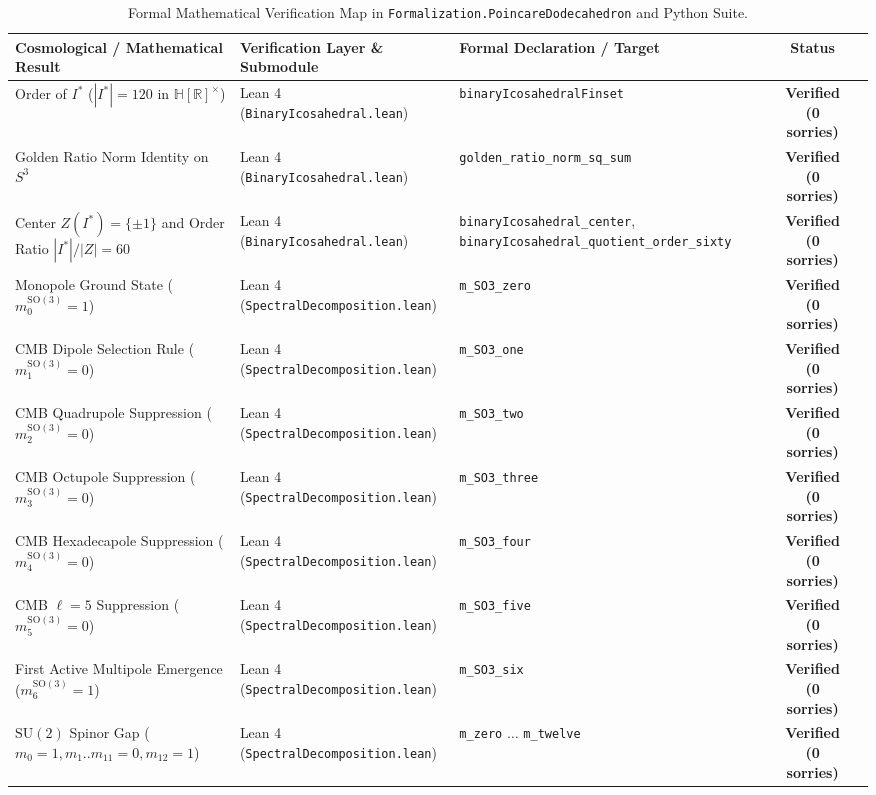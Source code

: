 \documentclass[11pt,a4paper]{article}
\theoremstyle{definition}
\newcommand{\SO}{\mathrm{SO}}
\newcommand{\SU}{\mathrm{SU}}
\begin{document}
\begin{table}[htbp]
\centering
\caption{Formal Mathematical Verification Map in \texttt{Formalization.PoincareDodecahedron} and Python Suite.}
\label{tab:lean}
\vspace{0.4em}
\begin{tabular}{lllcc}
\toprule
\textbf{Cosmological / Mathematical Result} & \textbf{Verification Layer \& Submodule} & \textbf{Formal Declaration / Target} & \textbf{Status} \\
\midrule
Order of $I^*$ ($|I^*| = 120$ in $\mathbb{H}[\mathbb{R}]^\times$) & Lean 4 (\texttt{BinaryIcosahedral.lean}) & \texttt{binaryIcosahedralFinset} & \textbf{Verified (0 sorries)} \\
Golden Ratio Norm Identity on $S^3$ & Lean 4 (\texttt{BinaryIcosahedral.lean}) & \texttt{golden\_ratio\_norm\_sq\_sum} & \textbf{Verified (0 sorries)} \\
Center $Z(I^*) = \{\pm 1\}$ and Order Ratio $|I^*|/|Z| = 60$ & Lean 4 (\texttt{BinaryIcosahedral.lean}) & \texttt{binaryIcosahedral\_center}, \texttt{binaryIcosahedral\_quotient\_order\_sixty} & \textbf{Verified (0 sorries)} \\
Monopole Ground State ($m_0^{\SO(3)} = 1$) & Lean 4 (\texttt{SpectralDecomposition.lean}) & \texttt{m\_SO3\_zero} & \textbf{Verified (0 sorries)} \\
CMB Dipole Selection Rule ($m_1^{\SO(3)} = 0$) & Lean 4 (\texttt{SpectralDecomposition.lean}) & \texttt{m\_SO3\_one} & \textbf{Verified (0 sorries)} \\
CMB Quadrupole Suppression ($m_2^{\SO(3)} = 0$) & Lean 4 (\texttt{SpectralDecomposition.lean}) & \texttt{m\_SO3\_two} & \textbf{Verified (0 sorries)} \\
CMB Octupole Suppression ($m_3^{\SO(3)} = 0$) & Lean 4 (\texttt{SpectralDecomposition.lean}) & \texttt{m\_SO3\_three} & \textbf{Verified (0 sorries)} \\
CMB Hexadecapole Suppression ($m_4^{\SO(3)} = 0$) & Lean 4 (\texttt{SpectralDecomposition.lean}) & \texttt{m\_SO3\_four} & \textbf{Verified (0 sorries)} \\
CMB $\ell=5$ Suppression ($m_5^{\SO(3)} = 0$) & Lean 4 (\texttt{SpectralDecomposition.lean}) & \texttt{m\_SO3\_five} & \textbf{Verified (0 sorries)} \\
First Active Multipole Emergence ($m_6^{\SO(3)} = 1$) & Lean 4 (\texttt{SpectralDecomposition.lean}) & \texttt{m\_SO3\_six} & \textbf{Verified (0 sorries)} \\
$\SU(2)$ Spinor Gap ($m_0=1, m_1..m_{11}=0, m_{12}=1$) & Lean 4 (\texttt{SpectralDecomposition.lean}) & \texttt{m\_zero} $\dots$ \texttt{m\_twelve} & \textbf{Verified (0 sorries)} \\

\end{tabular}
\end{table}
\end{document}

